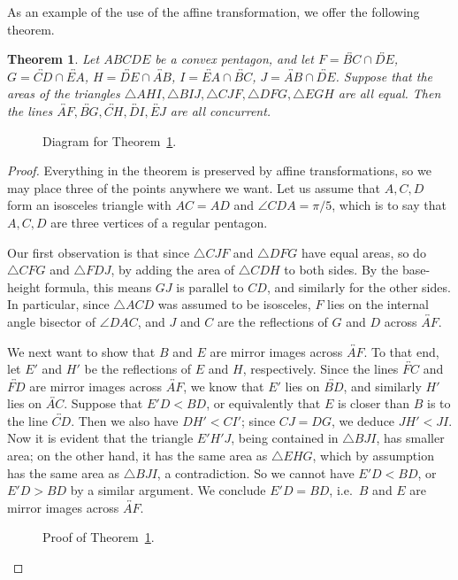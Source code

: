 \documentclass[12pt]{book}
\numberwithin{exc}{section}
\numberwithin{figure}{section}
\newtheorem{theorem}{Theorem}[section]
\numberwithin{equation}{theorem}
\def\ang{\angle}
\def\line#1{\overleftrightarrow{#1}}
\begin{document}
As an example of the use of the affine transformation, we offer the 
following theorem.
\begin{theorem} \label{thm:sample affine}
Let  $ABCDE$ be a convex pentagon, and let $F = \line{BC} \cap \line{DE}$, 
$G = \line{CD} \cap 
\line{EA}$, $H = \line{DE} \cap \line{AB}$, $I = \line{EA} \cap \line{BC}$, 
$J = \line{AB} \cap \line{DE}$. Suppose 
that the areas of the triangles $\triangle AHI, \triangle BIJ, \triangle CJF, 
\triangle DFG, \triangle EGH$ are all 
equal. Then the lines $\line{AF}, \line{BG}, \line{CH}, \line{DI}, \line{EJ}$ 
are all concurrent. 
\end{theorem}
\begin{figure}[ht]
\caption{Diagram for Theorem~\ref{thm:sample affine}.}
\end{figure}
\begin{proof}
Everything in the theorem is preserved by affine transformations,
so we may place three 
of the points anywhere we want. Let us assume that $A, C, D$ form an 
isosceles triangle with $AC = AD$ and $\angle CDA = \pi/5$, which is 
to say that $A, C, D$ are three vertices of a regular pentagon.

Our first observation is that since $\triangle CJF$ and $\triangle DFG$ have equal areas, 
so do $\triangle CFG$ and $\triangle FDJ$, by adding the area of $\triangle CDH$ to both sides. By 
the base-height formula, this means $GJ$ is parallel to $CD$, and 
similarly for the other sides. In particular, since $\triangle ACD$ was assumed 
to be isosceles, $F$ lies on the internal angle bisector of $\ang DAC$,
and $J$ and $C$ are the reflections of $G$ and $D$ across $\line{AF}$.

We next want to show that $B$ and $E$ are mirror images 
across $\line{AF}$. To that end,
let $E'$ and $H'$ be the reflections of $E$ and $H$, respectively. 
Since the lines $\line{FC}$ and $\line{FD}$ are mirror images across
$\line{AF}$, we know that $E'$ lies on 
$\line{BD}$, and similarly $H'$ lies on $\line{AC}$. 
Suppose that $E'D < BD$, or 
equivalently that $E$ is closer than $B$ is to the line $\line{CD}$. Then we 
also have $DH' < CI'$; since $CJ = DG$, we deduce $JH' < JI$. Now it 
is evident that the triangle $E'H'J$, being contained in $\triangle BJI$, has 
smaller area; on the other hand, it has the same area as $\triangle EHG$, which 
by assumption has the same area as $\triangle BJI$, a contradiction. So we 
cannot have $E'D < BD$, or $E'D > BD$ by a similar argument. We 
conclude $E'D = BD$, i.e.\ $B$ and $E$ are mirror images across $\line{AF}$. 
\begin{figure}[ht]
\caption{Proof of Theorem~\ref{thm:sample affine}.}
\end{figure}


\end{proof}
\end{document}
